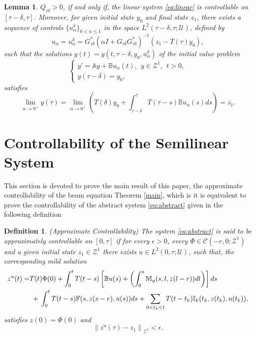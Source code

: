 \documentclass[11 pt]{amsart}
\newtheorem{definition}{\sc Definition}[section]
\newtheorem{lemma}{\sc Lemma}[section]
\begin{document}
\begin{lemma}\label{lema}
$Q_{\tau\delta}> 0$, if and only if, the linear system \eqref{eq:linear} is controllable on $[\tau-\delta, \tau]$.
Moreover, for  given initial state $y_0$ and  final state $z_{1}$, there exists a sequence of controls $\{u_{\alpha}^{\delta}\}_{0 <\alpha \leq 1}$ in the space $L^2(\tau-\delta,\tau;{\mathcal{U}})$, defined by
$$
u_{\alpha}=u_{\alpha}^{\delta}= G_{\tau\delta}^{*}(\alpha I+ G_{\tau\delta}G_{\tau\delta}^{*})^{-1}(z_{1} - T(\tau)y_0),
$$
such that the solutions $y(t)=y(t,\tau-\delta, y_0, u_{\alpha}^{\delta})$ of the initial value problem
\begin{equation}\label{IVL}
\left\{
\begin{array}{l}
y'={\mathbb{A}} y+{\mathbb{B}} u_{\alpha}(t), \ \  y \in {\mathcal{Z}}^{1}, \ \ t>0,\\
y(\tau-\delta) = y_0,
\end{array}
\right.
\end{equation}
satisfies
\begin{equation}\label{eq:limit}
\lim_{\alpha \to 0^{+}}y(\tau)
= \lim_{\alpha \to 0^{+}}\left(T(\delta)y_0 + \int_{\tau-\delta}^{\tau}T(\tau-s){\mathbb{B}} u_{\alpha}(s)ds \right)= z_{1}.
\end{equation}
\end{lemma}

\section{Controllability of the Semilinear System}\label{sec:semilineal}

This section is devoted to prove the main result of this paper,   the approximate controllability of the beam equation  Theorem \ref{main}, which is  it is equivalent to prove the controllability of the abstract system \eqref{eq:abstract}  given in the following definition

\begin{definition} \label{def2}{\rm (}{\sf Approximate Controllability}{\rm )}  The system \eqref{eq:abstract} is said
to be approximately controllable on $[0,\tau]$
if  for every $\epsilon>0$,   every
$\Phi\in {\mathcal{C}}\left(-r,0;  {\mathcal{Z}}^{1} \right)$ and a given initial state $z_{1}\in {\mathcal{Z}}^{1}$ there exists $u\in L^{2}(0,\tau;{\mathcal{U}})$, such that,  the corresponding  mild solution
\begin{align}\label{eq:mild}
z^{u}(t) = & {\displaystyle} T(t)\Phi(0)+\int_{0}^{t}T(t-s)\left[{\mathbb{B}} u(s)+\left(\int_{0}^{s}{\mathbb{M}_g}(s,l,z(l-r))dl\right)\right]ds \\
& \;+   {\displaystyle} \int_{0}^{t}T(t-s){\mathbb{F}}(s,z(s-r),u(s))ds  +   \sum_{0 < t_k < t} T(t-t_k ){\mathbb{I}}_{k}(t_k,z(t_k), u(t_k)),  \nonumber
\end{align}
satisfies $z(0)=\Phi(0)$ and
\begin{equation}\label{eq:goal}
{\left\| { z^u(\tau) - z_{1}}\right\|}_{{\mathcal{Z}}^1}<\epsilon.
\end{equation}

\end{definition}
\end{document}
